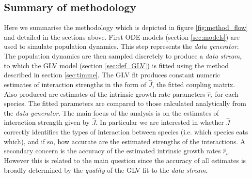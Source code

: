 \subsection{Summary of methodology}
\label{sec:method_summary}

Here we summarise the methodology which is depicted in figure \ref{fig:method_flow} and detailed in the sections above. First ODE models (section \ref{sec:models}) are used to simulate population dynamics. This step represents the \emph{data generator}. The population dynamics are then sampled discretely to produce a \emph{data stream}, to which the GLV model (section \ref{sec:def_GLV}) is fitted using the method described in section \ref{sec:timme}. The GLV fit produces constant numeric estimates of interaction strengths in the form of $\hat{J}$, the fitted coupling matrix. Also produced are estimates of the intrinsic growth rate parameters $\hat{r}_i$ for each species. The fitted parameters are compared to those calculated analytically from the \emph{data generator}. The main focus of the analysis is on the estimates of interaction strength given by $\hat{J}$. In particular we are interested in whether $\hat{J}$ correctly identifies the types of interaction between species (i.e. which species eats which), and if so, how accurate are the estimated strengths of the interactions. A secondary concern is the accuracy of the estimated intrinsic growth rates $\hat{r}_i$. However this is related to the main question since the accuracy of all estimates is broadly determined by the \emph{quality} of the GLV fit to the \emph{data stream}.





